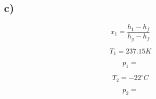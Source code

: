 

\subsection*{c)}

\[
x_1 = \frac{h_1 - h_f}{h_g - h_f}
\]

\[
T_1 = 237.15 K
\]

\[
p_1 = 
\]

\[
T_2 = -22^\circ C
\]

\[
p_2 = 
\]